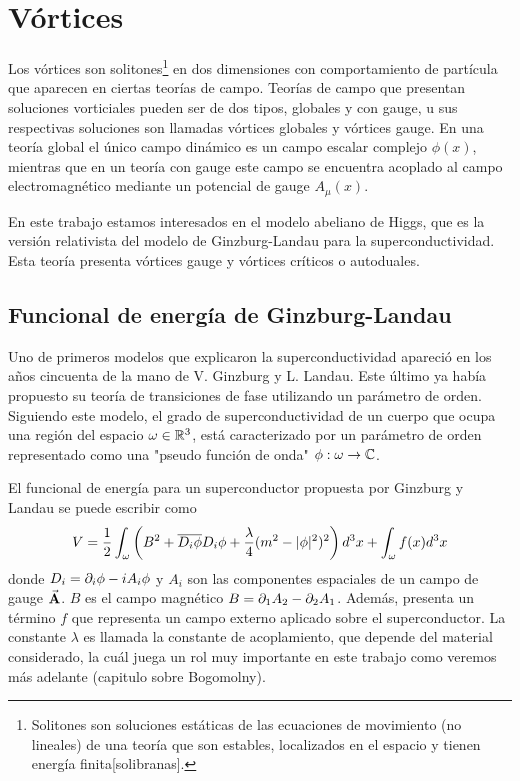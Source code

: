 
\chapter{Vórtices} %

\label{ch:introduction} %


Los vórtices son solitones\footnote{Solitones son soluciones estáticas de las ecuaciones de movimiento (no lineales) de una teoría que son estables, localizados en el espacio y tienen energía finita[solibranas].} en dos dimensiones con comportamiento de partícula que aparecen en ciertas teorías de campo.
Teorías de campo que presentan soluciones vorticiales pueden ser de dos tipos, globales y con gauge, u sus respectivas soluciones son llamadas vórtices globales y vórtices gauge. En una teoría global el único campo dinámico es un campo escalar complejo $\phi(x)$, mientras que en un teoría con gauge este campo se encuentra acoplado al campo electromagnético mediante un potencial de gauge $A_\mu(x)$. 

En este trabajo estamos interesados en el modelo abeliano de Higgs, que es la versión relativista del modelo de Ginzburg-Landau para la superconductividad. Esta teoría presenta vórtices gauge y vórtices críticos o autoduales.

\section{Funcional de energía de Ginzburg-Landau}

Uno de primeros modelos que explicaron la superconductividad apareció en los años cincuenta de la mano de V. Ginzburg y L. Landau. Este último ya había propuesto su teoría de transiciones de fase utilizando un parámetro de orden. Siguiendo este modelo, el grado de superconductividad de un cuerpo que ocupa una región del espacio $\omega\in\mathbb{R}^3$, está caracterizado por un parámetro de orden representado como una "pseudo función de onda" $\phi:\omega\rightarrow\mathbb{C}$.

El funcional de energía para un superconductor propuesta por Ginzburg y Landau se puede escribir como
\begin{align}
  V = \frac{1}{2}\int_\omega\left(B^2+\overline{D_i\phi}D_i\phi+\frac{\lambda}{4}(m^2-|\phi|^2)^2\right)d^3x + \int_\omega f(x)d^3x \label{eq:1} 
\end{align}
donde $D_i=\partial_i\phi-i A_i\phi$ y $A_i$ son las componentes espaciales de un campo de gauge $\vec{\mathbf{A}}$. $B$ es el campo magnético $B=\partial_1A_2-\partial_2 A_1$. Además, presenta un término $f$ que representa un campo externo aplicado sobre el superconductor. La constante $\lambda$ es llamada la constante de acoplamiento, que depende del material considerado, la cuál juega un rol muy importante en este trabajo como veremos más adelante (capitulo sobre Bogomolny).

